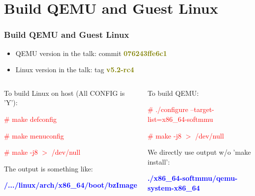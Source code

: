 \documentclass[aspectratio=169]{beamer}
\begin{document}
\section{Build QEMU and Guest Linux}
\begin{frame}
\frametitle{Build QEMU and Guest Linux}
\begin{itemize}
\item {\Large QEMU version in the talk: commit \textbf{\textcolor{olive}{076243ffe6c1}}}
\item {\Large Linux version in the talk: tag \textbf{\textcolor{olive}{v5.2-rc4}}}
\end{itemize}
\begin{columns}[c]
\begin{block}{}
{ \small
To build Linux on host (All CONFIG is 'Y'):

\textcolor{red}{\# make defconfig}

\textcolor{red}{\# make menuconfig}

\textcolor{red}{\# make -j8 $>$ /dev/null} \newline

The output is something like:

\textbf{\textcolor{blue}{/.../linux/arch/x86\_64/boot/bzImage}}
}
\end{block}
\begin{block}{}
{ \small
To build QEMU:

\textcolor{red}{\# ./configure --target-list=x86\_64-softmmu}

\textcolor{red}{\# make -j8 $>$ /dev/null} \newline

We directly use output w/o 'make install':

\textbf{\textcolor{blue}{./x86\_64-softmmu/qemu-system-x86\_64}}
}
\end{block}
\end{columns}
\end{frame}

\end{document}
